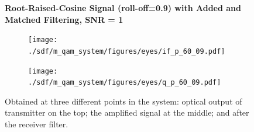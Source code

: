 \begin{refsection}
\begin{table}[H]
\begin{tabular}{|l|l|}
	\end{tabular}
\end{table}
\begin{figure}[H]
		\centering
	\textbf{Root-Raised-Cosine Signal (roll-off=0.9) with Added  and Matched Filtering, SNR = 1}
	\begin{minipage}{\linewidth}
		\centering
	\begin{subfigure}{.45\textwidth}
		\centering
		\texttt{[image: ./sdf/m\_qam\_system/figures/eyes/if\_p\_60\_09.pdf]}
	\end{subfigure}
	\begin{subfigure}{.45\textwidth}
		\centering
		\texttt{[image: ./sdf/m\_qam\_system/figures/eyes/q\_p\_60\_09.pdf]}
	\end{subfigure}
	
	\caption{
		Obtained at three different points in the system: optical output of transmitter on the top;
		the amplified signal at the middle; and
		after the receiver filter.
		\label{fig:eyes_n_rrc_60_09}}
	\end{minipage}
\end{figure}



\end{refsection}
